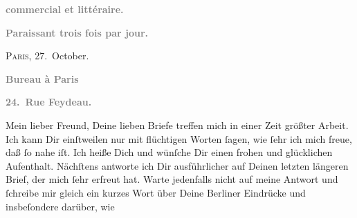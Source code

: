 \begin{ledgroupsized}[t]{13cm}
           \pstart
           \begin{otherlanguage}{french}\textcolor{gray}{\textbf{commercial et littéraire.}}\end{otherlanguage}\pend
           \pstart
           \begin{otherlanguage}{french}\textcolor{gray}{\textbf{\textbf{Paraissant trois fois par jour.}}}\end{otherlanguage}\hfill \textsc{Paris}, 27. October.\pend
           \pstart
           \begin{otherlanguage}{french}\textcolor{gray}{\textbf{\textbf{Bureau à Paris}}}\end{otherlanguage}\pend
           \pstart
           \begin{otherlanguage}{french}\textcolor{gray}{\textbf{\textbf{24. Rue Feydeau.}}}\end{otherlanguage}\pend
           \pstart{}Mein lieber Freund,\pend\pstart
           Deine lieben Briefe treffen mich in einer Zeit größter Arbeit. Ich kann Dir
               einſtweilen nur mit flüchtigen Worten ſagen, wie ſehr ich mich freue, daß \label{K_L02788-1v}\label{K_L02788-1h} ſo nahe iſt. Ich heiße Dich \label{K_L02788-2v}\label{K_L02788-2h} und wünſche Dir einen frohen
               und glücklichen Aufenthalt. Nächſtens antworte ich Dir ausführlicher auf Deinen
               letzten längeren Brief, der mich ſehr erfreut hat. {\pb}Warte jedenfalls nicht auf meine Antwort und ſchreibe mir gleich ein kurzes Wort
               über Deine Berliner  Eindrücke und insbeſondere  darüber, wie

\end{ledgroupsized}
